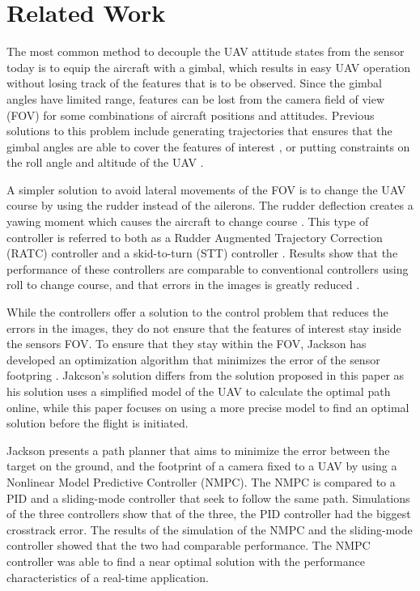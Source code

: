 \section{Related Work}

The most common method to decouple the UAV attitude states from the sensor today is to equip the aircraft with a gimbal, which results in easy UAV operation without losing track of the features that is to be observed. Since the gimbal angles have limited range, features can be lost from the camera field of view (FOV) for some combinations of aircraft positions and attitudes. Previous solutions to this problem include generating trajectories that ensures that the gimbal angles are able to cover the features of interest \cite{nundalSKJONG}, or putting constraints on the roll angle and altitude of the UAV \cite{constraintsEGBERT}.

A simpler solution to avoid lateral movements of the FOV is to change the UAV course by using the rudder instead of the ailerons. The rudder deflection creates a yawing moment which causes the aircraft to change course \cite{ratcFISHER}. This type of controller is referred to both as a Rudder Augmented Trajectory Correction (RATC) controller \cite{ratcFISHER} and a skid-to-turn (STT) controller \cite{skidMILLS}. Results show that the performance of these controllers are comparable to conventional controllers using roll to change course, and that errors in the images is greatly reduced \cite{ratcFISHER}\cite{skidMILLS}\cite{alternateAHSAN}.

While the controllers offer a solution to the control problem that reduces the errors in the images, they do not ensure that the features of interest stay inside the sensors FOV. To ensure that they stay within the FOV, Jackson has developed an optimization algorithm that minimizes the error of the sensor footpring \cite{optimJACKSON}. Jakcson's solution differs from the solution proposed in this paper as his solution uses a simplified model of the UAV to calculate the optimal path online, while this paper focuses on using a more precise model to find an optimal solution before the flight is initiated.

Jackson presents a path planner that aims to minimize the error between the target on the ground, and the footprint of a camera fixed to a UAV by using a Nonlinear Model Predictive Controller (NMPC). The NMPC is compared to a PID and a sliding-mode controller that seek to follow the same path. Simulations of the three controllers show that of the three, the PID controller had the biggest crosstrack error. The results of the simulation of the NMPC and the sliding-mode controller showed that the two had comparable performance. The NMPC controller was able to find a near optimal solution with the performance characteristics of a real-time application.

